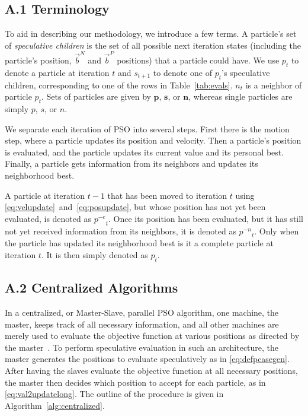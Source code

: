 \documentclass[smallcondensed]{svjour3}
\newcommand{\alg}[1]{Algorithm~\ref{alg:#1}}
\providecommand{\pers}{\ensuremath{P}}
\providecommand{\neigh}{\ensuremath{N}}
\providecommand{\nbest}{\ensuremath{\Vec{b}^\neigh}}
\providecommand{\pbest}{\ensuremath{\Vec{b}^\pers}}
\providecommand{\noeval}[1]{\ensuremath{#1^{-e}}}
\providecommand{\nonbest}[1]{\ensuremath{#1^{-n}}}
\providecommand{\p}{\ensuremath{p}}
\providecommand{\pset}{\ensuremath{\mathbf{p}}}
\providecommand{\s}{\ensuremath{s}}
\providecommand{\sset}{\ensuremath{\mathbf{s}}}
\providecommand{\n}{\ensuremath{n}}
\providecommand{\nset}{\ensuremath{\mathbf{n}}}
\begin{document}
\subsection*{A.1 Terminology}

To aid in describing our methodology, we introduce a few terms.  A particle's
set of \emph{speculative children} is the set of all possible next iteration
states (including the particle's position, $\nbest$ and $\pbest$ positions)
that a particle could have.  We use $\p_t$ to denote a particle at iteration
$t$ and $\s_{t+1}$ to denote one of $\p_t$'s speculative children,
corresponding to one of the rows in Table~\ref{tab:evals}.  $\n_t$ is a
neighbor of particle $\p_t$.  Sets of particles are given by $\pset$, $\sset$,
or $\nset$, whereas single particles are simply $\p$, $\s$, or $\n$.

We separate each iteration of PSO into several steps.  First there is the
motion step, where a particle updates its position and velocity.  Then a
particle's position is evaluated, and the particle updates its current value
and its personal best.  Finally, a particle gets information from its neighbors
and updates its neighborhood best.

A particle at iteration $t-1$ that has been moved to iteration $t$ using
\eqref{eq:velupdate}~and~\eqref{eq:posupdate}, but whose position has
not yet been evaluated, is denoted as $\noeval{\p}_t$.  Once its position has
been evaluated, but it has still not yet received information from its
neighbors, it is denoted as $\nonbest{\p}_t$.  Only when the particle has
updated its neighborhood best is it a complete particle at iteration $t$.  It
is then simply denoted as $\p_t$.

\subsection*{A.2 Centralized Algorithms}

In a centralized, or Master-Slave, parallel PSO algorithm, one machine, the
master, keeps track of all necessary information, and all other machines are
merely used to evaluate the objective function at various positions as directed
by the master~\citep{belal-2004-parallel-models-for-pso}.  To perform
speculative evaluation in such an architecture, the master generates the
positions to evaluate speculatively as in \eqref{eq:defpcasegen}.  After having
the slaves evaluate the objective function at all necessary positions, the
master then decides which position to accept for each particle, as in
\eqref{eq:val2updatelong}.  The outline of the procedure is given in
\alg{centralized}.
\end{document}
